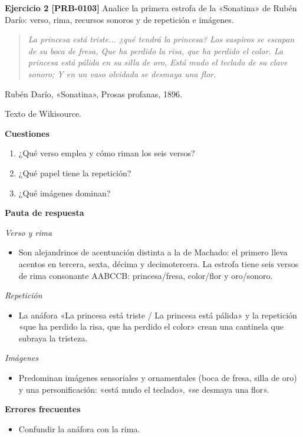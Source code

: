 \documentclass{book}
\begin{document}
\noindent\textbf{Ejercicio 2 [PRB-0103]}
Analice la primera estrofa de la «Sonatina» de Rubén Darío: verso, rima, recursos sonoros y de repetición e imágenes.


\begin{quote}
\itshape La princesa está triste... ¿qué tendrá la princesa? Los suspiros se escapan de su boca de fresa, Que ha perdido la risa, que ha perdido el color. La princesa está pálida en su silla de oro, Está mudo el teclado de su clave sonoro; Y en un vaso olvidada se desmaya una flor.
\end{quote}
{\noindent\footnotesize Rubén Darío, «Sonatina», Prosas profanas, 1896.\par}
{\noindent\footnotesize Texto de Wikisource.\par}

\noindent\textbf{Cuestiones}
\begin{enumerate}
\item ¿Qué verso emplea y cómo riman los seis versos?
\item ¿Qué papel tiene la repetición?
\item ¿Qué imágenes dominan?
\end{enumerate}

\noindent\textbf{Pauta de respuesta}

\noindent\textit{Verso y rima}
\begin{itemize}
\item Son alejandrinos de acentuación distinta a la de Machado: el primero lleva acentos en tercera, sexta, décima y decimotercera. La estrofa tiene seis versos de rima consonante AABCCB: princesa/fresa, color/flor y oro/sonoro.
\end{itemize}

\noindent\textit{Repetición}
\begin{itemize}
\item La anáfora «La princesa está triste / La princesa está pálida» y la repetición «que ha perdido la risa, que ha perdido el color» crean una cantinela que subraya la tristeza.
\end{itemize}

\noindent\textit{Imágenes}
\begin{itemize}
\item Predominan imágenes sensoriales y ornamentales (boca de fresa, silla de oro) y una personificación: «está mudo el teclado», «se desmaya una flor».
\end{itemize}

\noindent\textbf{Errores frecuentes}
\begin{itemize}
\item Confundir la anáfora con la rima.
\end{itemize}
\end{document}
